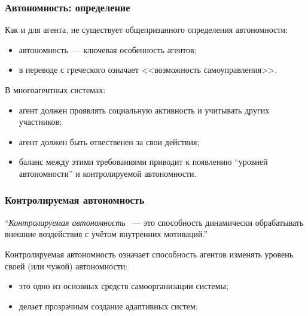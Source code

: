 \documentclass{beamer}
\begin{document}
\begin{frame}
  \frametitle{Автономность: определение}
  Как и для агента, не существует общепризанного определения автономности:
  \begin{itemize}
    \item автономность~--- ключевая особенность агентов;
    \item в переводе с греческого означает <<возможность самоуправления>>.
  \end{itemize}

  В многоагентных системах:
  \begin{itemize}
    \item агент должен проявлять социальную активность и учитывать других участников;
    \item агент должен быть отвественен за свои действия;
    \item баланс между этими требованиями приводит к появлению ``уровней автономности''
      и контролируемой автономности.
  \end{itemize}
\end{frame}

\begin{frame}
  \frametitle{Контролируемая автономность}
  \begin{exampleblock}{}
    {\large ``{\it Контролируемая автономность} ~--- это способность динамически
    обрабатывать внешние воздействия с учётом внутренних мотиваций.''}
    \vskip5mm
    \hspace*{}
  \end{exampleblock}

  Контролируемая автономность означает способность агентов изменять
  уровень своей (или чужой) автономности:
  \begin{itemize}
    \item это одно из основных средств самоорганизации системы;
    \item делает прозрачным создание адаптивных систем;
  \end{itemize}
\end{frame}
\end{document}
